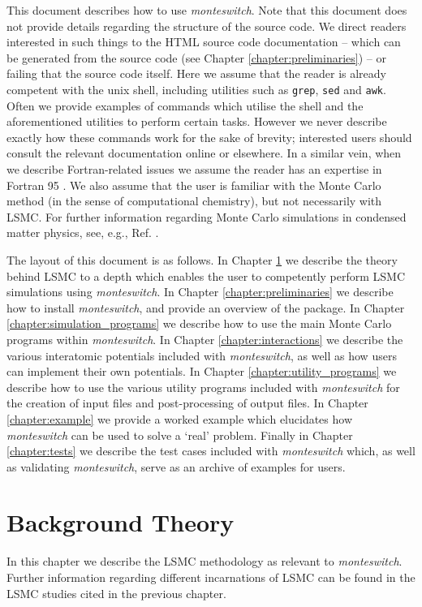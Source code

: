 \documentclass{report}
\begin{document}
This document describes how to use \emph{monteswitch}. Note that this document does not provide details regarding the structure of the source code. 
We direct readers interested in such things to the HTML source code documentation -- which can be generated from the source code (see Chapter
\ref{chapter:preliminaries}) -- or failing that the source code itself. Here we assume that the reader is already competent with the unix shell, 
including utilities such as \texttt{grep}, \texttt{sed} and \texttt{awk}. Often we provide examples of commands which utilise the shell and the 
aforementioned utilities to perform certain tasks. However we never describe exactly how these commands work for the sake of brevity; interested users
should consult the relevant documentation online or elsewhere. In a similar vein, when we describe Fortran-related issues we assume the reader has 
an expertise in Fortran 95 . We also assume that the user is familiar with the Monte Carlo method (in the sense of computational
chemistry), but not necessarily with LSMC. For further information regarding Monte Carlo simulations in condensed 
matter physics, see, e.g., Ref. \cite{book:Frenkel}. 

The layout of this document is as follows. In Chapter \ref{chapter:background} we describe the theory behind LSMC to a depth which enables the user to 
competently perform LSMC simulations using \emph{monteswitch}.
In Chapter \ref{chapter:preliminaries} we describe how to install \emph{monteswitch}, and provide
an overview of the package. In Chapter \ref{chapter:simulation_programs} we describe how to use the main Monte Carlo programs within
\emph{monteswitch}. In Chapter \ref{chapter:interactions} we describe the various interatomic potentials included with \emph{monteswitch}, as well as
how users can implement their own potentials. In Chapter \ref{chapter:utility_programs} we describe how to use the various utility
programs included with \emph{monteswitch} for the creation of input files and post-processing of output files. In Chapter \ref{chapter:example}
we provide a worked example which elucidates how \emph{monteswitch} can be used to solve a `real' problem. Finally in Chapter \ref{chapter:tests}
we describe the test cases included with \emph{monteswitch} which, as well as validating \emph{monteswitch}, serve as an archive of examples
for users.




\chapter{Background Theory}\label{chapter:background}
In this chapter we describe the LSMC methodology as relevant to \emph{monteswitch}. Further information regarding different incarnations of
LSMC can be found in the LSMC studies cited in the previous chapter.
\end{document}
